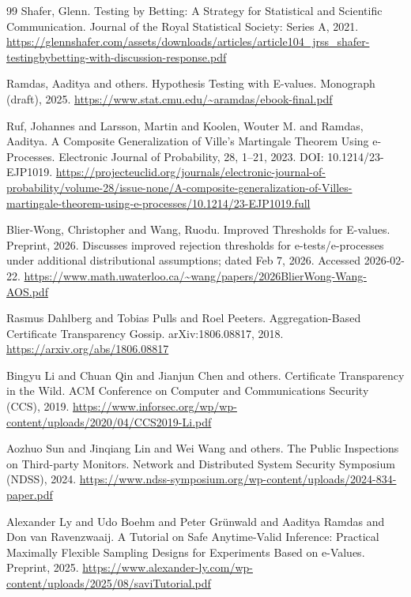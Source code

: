 \documentclass[11pt]{article}
\begin{document}
\begin{thebibliography}{99}
Shafer, Glenn.
\newblock Testing by Betting: A Strategy for Statistical and Scientific Communication.
\newblock Journal of the Royal Statistical Society: Series A, 2021.
\newblock \url{https://glennshafer.com/assets/downloads/articles/article104_jrss_shafer-testingbybetting-with-discussion-response.pdf}

Ramdas, Aaditya and others.
\newblock Hypothesis Testing with E-values.
\newblock Monograph (draft), 2025.
\newblock \url{https://www.stat.cmu.edu/~aramdas/ebook-final.pdf}

Ruf, Johannes and Larsson, Martin and Koolen, Wouter M. and Ramdas, Aaditya.
\newblock A Composite Generalization of Ville's Martingale Theorem Using e-Processes.
\newblock Electronic Journal of Probability, 28, 1--21, 2023.
\newblock DOI: 10.1214/23-EJP1019.
\newblock \url{https://projecteuclid.org/journals/electronic-journal-of-probability/volume-28/issue-none/A-composite-generalization-of-Villes-martingale-theorem-using-e-processes/10.1214/23-EJP1019.full}

Blier-Wong, Christopher and Wang, Ruodu.
\newblock Improved Thresholds for E-values.
\newblock Preprint, 2026.
\newblock Discusses improved rejection thresholds for e-tests/e-processes under additional distributional assumptions; dated Feb 7, 2026. Accessed 2026-02-22.
\newblock \url{https://www.math.uwaterloo.ca/~wang/papers/2026BlierWong-Wang-AOS.pdf}

Rasmus Dahlberg and Tobias Pulls and Roel Peeters.
\newblock Aggregation-Based Certificate Transparency Gossip.
\newblock arXiv:1806.08817, 2018.
\newblock \url{https://arxiv.org/abs/1806.08817}

Bingyu Li and Chuan Qin and Jianjun Chen and others.
\newblock Certificate Transparency in the Wild.
\newblock ACM Conference on Computer and Communications Security (CCS), 2019.
\newblock \url{https://www.inforsec.org/wp/wp-content/uploads/2020/04/CCS2019-Li.pdf}

Aozhuo Sun and Jinqiang Lin and Wei Wang and others.
\newblock The Public Inspections on Third-party Monitors.
\newblock Network and Distributed System Security Symposium (NDSS), 2024.
\newblock \url{https://www.ndss-symposium.org/wp-content/uploads/2024-834-paper.pdf}

Alexander Ly and Udo Boehm and Peter Gr\"unwald and Aaditya Ramdas and Don van Ravenzwaaij.
\newblock A Tutorial on Safe Anytime-Valid Inference: Practical Maximally Flexible Sampling Designs for Experiments Based on e-Values.
\newblock Preprint, 2025.
\newblock \url{https://www.alexander-ly.com/wp-content/uploads/2025/08/saviTutorial.pdf}


\end{thebibliography}
\end{document}
